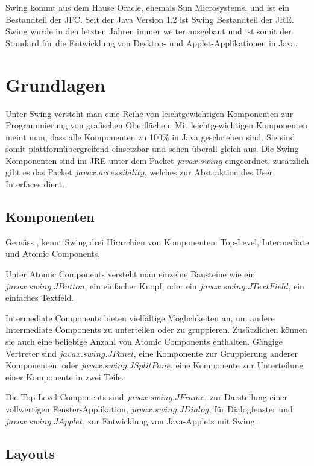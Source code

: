   Swing kommt aus dem Hause Oracle, ehemals Sun Microsystems, und ist ein
  Bestandteil der \ac{JFC}. Seit der Java Version 1.2 ist Swing Bestandteil der
  \ac{JRE}. Swing wurde in den letzten Jahren immer weiter ausgebaut und ist
  somit der Standard für die Entwicklung von Desktop- und Applet-Applikationen
  in Java.
  
  \section{Grundlagen}
  
  Unter Swing versteht man eine Reihe von leichtgewichtigen Komponenten zur
  Programmierung von grafischen Oberflächen. Mit leichtgewichtigen Komponenten
  meint man, dass alle Komponenten zu 100\% in Java geschrieben sind. Sie sind
  somit plattformübergreifend einsetzbar und sehen überall gleich aus. Die Swing
  Komponenten sind im \ac{JRE} unter dem Packet \(javax.swing\) eingeordnet,
  zusätzlich gibt es das Packet \(javax.accessibility\), welches zur
  Abstraktion des User Interfaces dient.
  
  \subsection{Komponenten}
  
  Gemäss \cite{SwingComponentsHighscore}, kennt Swing drei Hirarchien von
  Komponenten: Top-Level, Intermediate und Atomic Components.
  
  Unter Atomic Components versteht man einzelne Bausteine wie ein
  \(javax.swing.JButton\), ein einfacher Knopf, oder ein
  \(javax.swing.JTextField\), ein einfaches Textfeld.
  
  Intermediate Components bieten vielfältige Möglichkeiten an, um andere
  Intermediate Components zu unterteilen oder zu gruppieren. Zusätzlichen
  können sie auch eine beliebige Anzahl von Atomic Components enthalten. Gängige
  Vertreter sind \(javax.swing.JPanel\), eine Komponente zur Gruppierung anderer
  Komponenten, oder \(javax.swing.JSplitPane\), eine Komponente zur
  Unterteilung einer Komponente in zwei Teile.
  
  Die Top-Level Components sind \(javax.swing.JFrame\),
  zur Darstellung einer vollwertigen Fenster-Applikation,
  \(javax.swing.JDialog\), für Dialogfenster und \(javax.swing.JApplet\), zur
  Entwicklung von Java-Applets mit Swing.
  
  \subsection{Layouts}
  
